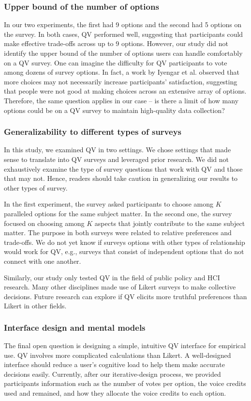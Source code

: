 \subsubsection{Upper bound of the number of options}

In our two experiments, the first had 9 options and the second had 5 options on the survey. In both cases, QV performed well, suggesting that participants could make effective trade-offs across up to 9 options. However, our study did not identify the upper bound of the number of options users can handle comfortably on a QV survey. One can imagine the difficulty for QV participants to vote among dozens of survey options. In fact, a work by Iyengar et al. \cite{iyengar2000choice} observed that more choices may not necessarily increase participants' satisfaction, suggesting that people were not good at making choices across an extensive array of options. Therefore, the same question applies in our case -- is there a limit of how many options could be on a QV survey to maintain high-quality data collection?

\subsubsection{Generalizability to different types of surveys}
In this study, we examined QV in two settings. We chose settings that made sense to translate into QV surveys and leveraged prior research. We did not exhaustively examine the type of survey questions that work with QV and those that may not. Hence, readers should take caution in generalizing our results to other types of survey.

In the first experiment, the survey asked participants to choose among $K$ paralleled options for the same subject matter. In the second one, the survey focused on choosing among $K$ aspects that jointly contribute to the same subject matter. The purpose in both surveys were related to relative preferences and trade-offs. We do not yet know if surveys options with other types of relationship would work for QV, e.g., surveys that consist of independent options that do not connect with one another.

Similarly, our study only tested QV in the field of public policy and HCI research. Many other disciplines made use of Likert surveys to make collective decisions. Future research can explore if QV elicits more truthful preferences than Likert in other fields.

\subsubsection{Interface design and mental models}
The final open question is designing a simple, intuitive QV interface for empirical use. QV involves more complicated calculations than Likert. A well-designed interface should reduce a user's cognitive load to help them make accurate decisions easily. Currently, after our iterative-design process, we provided participants information such as the number of votes per option, the voice credits used and remained, and how they allocate the voice credits to each option. 

